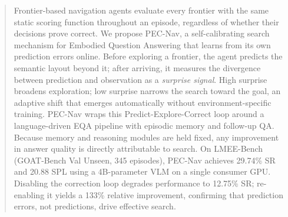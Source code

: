 \begin{abstract}
Frontier-based navigation agents evaluate every frontier with the same static scoring function throughout an episode, regardless of whether their decisions prove correct. We propose PEC-Nav, a self-calibrating search mechanism for Embodied Question Answering that learns from its own prediction errors online. Before exploring a frontier, the agent predicts the semantic layout beyond it; after arriving, it measures the divergence between prediction and observation as a \emph{surprise signal}. High surprise broadens exploration; low surprise narrows the search toward the goal, an adaptive shift that emerges automatically without environment-specific training. PEC-Nav wraps this Predict-Explore-Correct loop around a language-driven EQA pipeline with episodic memory and follow-up QA. Because memory and reasoning modules are held fixed, any improvement in answer quality is directly attributable to search. On LMEE-Bench (GOAT-Bench Val Unseen, 345 episodes), PEC-Nav achieves 29.74\% SR and 20.88 SPL using a 4B-parameter VLM on a single consumer GPU. Disabling the correction loop degrades performance to 12.75\% SR; re-enabling it yields a 133\% relative improvement, confirming that prediction errors, not predictions, drive effective search.
\end{abstract}
